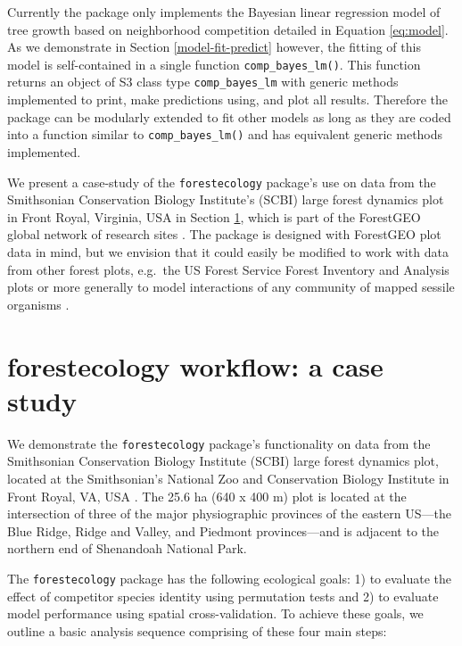 \documentclass[12pt]{article}
\begin{document}
Currently the package only implements the Bayesian linear regression
model of tree growth based on neighborhood competition detailed in
Equation \ref{eq:model}. As we demonstrate in Section
\ref{model-fit-predict} however, the fitting of this model is
self-contained in a single function \texttt{comp\_bayes\_lm()}. This
function returns an object of S3 class type \texttt{comp\_bayes\_lm}
with generic methods implemented to print, make predictions using, and
plot all results. Therefore the package can be modularly extended to fit
other models as long as they are coded into a function similar to
\texttt{comp\_bayes\_lm()} and has equivalent generic methods
implemented.

We present a case-study of the \texttt{forestecology} package's use on
data from the Smithsonian Conservation Biology Institute's (SCBI) large
forest dynamics plot in Front Royal, Virginia, USA in Section
\ref{casestudy}, which is part of the ForestGEO global network of
research sites
\citep[\citet{andersonteixeira_ctfs-forestgeo_2015}]{bourg_initial_2013}.
The package is designed with ForestGEO plot data in mind, but we
envision that it could easily be modified to work with data from other
forest plots, e.g.~the US Forest Service Forest Inventory and Analysis
plots or more generally to model interactions of any community of mapped
sessile organisms \citep{smith_forest_2002}.

\hypertarget{casestudy}{%
\section{forestecology workflow: a case study}\label{casestudy}}

We demonstrate the \texttt{forestecology} package's functionality on
data from the Smithsonian Conservation Biology Institute (SCBI) large
forest dynamics plot, located at the Smithsonian's National Zoo and
Conservation Biology Institute in Front Royal, VA, USA
\citep{bourg_initial_2013}. The 25.6 ha (640 x 400 m) plot is located at
the intersection of three of the major physiographic provinces of the
eastern US---the Blue Ridge, Ridge and Valley, and Piedmont
provinces---and is adjacent to the northern end of Shenandoah National
Park.

The \texttt{forestecology} package has the following ecological goals:
1) to evaluate the effect of competitor species identity using
permutation tests and 2) to evaluate model performance using spatial
cross-validation. To achieve these goals, we outline a basic analysis
sequence comprising of these four main steps:
\end{document}
